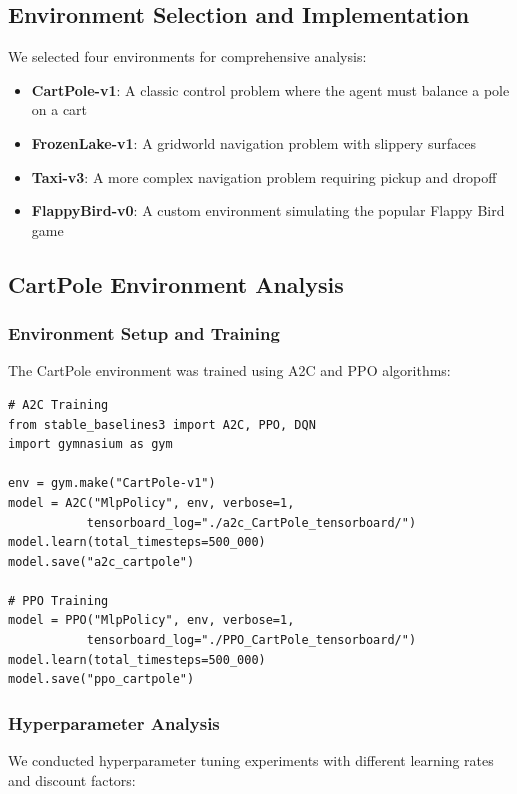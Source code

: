 \documentclass[12pt]{article}
\begin{document}
{{{\subsection{Environment Selection and Implementation}

We selected four environments for comprehensive analysis:

\begin{itemize}
    \item \textbf{CartPole-v1}: A classic control problem where the agent must balance a pole on a cart
    \item \textbf{FrozenLake-v1}: A gridworld navigation problem with slippery surfaces
    \item \textbf{Taxi-v3}: A more complex navigation problem requiring pickup and dropoff
    \item \textbf{FlappyBird-v0}: A custom environment simulating the popular Flappy Bird game
\end{itemize}

\subsection{CartPole Environment Analysis}

\subsubsection{Environment Setup and Training}

The CartPole environment was trained using A2C and PPO algorithms:

\begin{verbatim}
# A2C Training
from stable_baselines3 import A2C, PPO, DQN
import gymnasium as gym

env = gym.make("CartPole-v1")
model = A2C("MlpPolicy", env, verbose=1, 
           tensorboard_log="./a2c_CartPole_tensorboard/")
model.learn(total_timesteps=500_000)
model.save("a2c_cartpole")

# PPO Training
model = PPO("MlpPolicy", env, verbose=1, 
           tensorboard_log="./PPO_CartPole_tensorboard/")
model.learn(total_timesteps=500_000)
model.save("ppo_cartpole")
\end{verbatim}

\subsubsection{Hyperparameter Analysis}

We conducted hyperparameter tuning experiments with different learning rates and discount factors:

}}}
\end{document}
